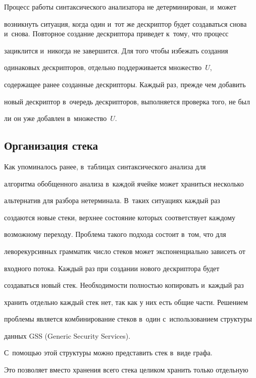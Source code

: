 Процесс работы синтаксического анализатора не детерминирован, и~может


возникнуть ситуация, когда один и~тот же дескриптор будет создаваться снова и~снова. Повторное создание дескриптора приведет к~тому, что процесс


за\-цик\-лит\-ся и~никогда не завершится. Для того чтобы избежать создания


одинаковых дескрипторов, отдельно поддерживается множество~$U$,


содержащее ранее созданные дескрипторы. Каждый раз, прежде чем добавить


новый дескриптор в~очередь дескрипторов, выполняется проверка того, не был


ли он уже добавлен в~множество~$U$.





\subsection{Организация стека}





	Как упоминалось ранее, в~таблицах синтаксического анализа для


алгоритма обобщенного анализа в~каждой ячейке может храниться несколько


альтернатив для разбора нетерминала. В~таких ситуациях каждый раз


создаются новые стеки, верхнее состояние которых соответствует каждому


возможному переходу. Проблема такого подхода состоит в~том, что для


леворекурсивных грамматик число стеков может экспоненциально зависеть от


входного потока. Каждый раз при создании нового дескриптора будет


создаваться новый стек. Необходимости полностью копировать и~каждый раз


хранить отдельно каждый стек нет, так как у них есть общие части. Решением


проблемы является комбинирование стеков в~один с~использованием структуры


данных GSS (Generic Security Services).


С~по\-мощью этой структуры можно представить стек в~виде графа.


Это позволяет вместо хранения всего стека целиком хранить только отдельную


